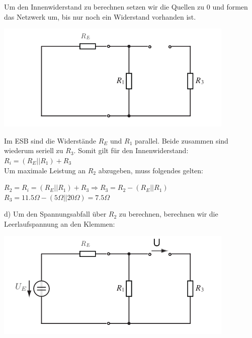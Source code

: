 Um den Innenwiderstand zu berechnen setzen wir die Quellen zu 0 und formen das Netzwerk um, bis nur noch ein Widerstand vorhanden ist. \\
\begin{center}

      \includegraphics[scale=2.0]{katalog/katalog-1/lr-3.png}
\end{center}
Im ESB sind die Widerstände $R_E$ und $R_1$ parallel. Beide zusammen sind wiederum seriell zu $R_3$. Somit gilt für den Innenwiderstand: \\
$R_i = (R_E || R_1) + R_3$ \\
Um maximale Leistung an $R_2$ abzugeben, muss folgendes gelten:
\begin{center}
  $R_2 = R_i = (R_E || R_1) + R_3 \Rightarrow R_3 = R_2 - (R_E || R_1)$ \\
  $R_3 = 11.5 \Omega - (5\Omega || 20 \Omega) = 7.5 \Omega$
\end{center}

\newpage
d) Um den Spannungsabfall über $R_2$ zu berechnen, berechnen wir die Leerlaufspannung an den Klemmen:
\begin{center}
        \includegraphics[scale=2.0]{katalog/katalog-1/lr-4.png} \\
\end{center}

